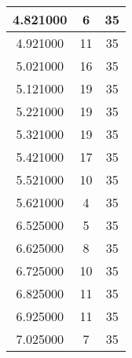 \begin{longtable}[htbp]{|c|c|c|}
4.821000 & 6 & 35 \\ \hline
4.921000 & 11 & 35 \\ \hline
5.021000 & 16 & 35 \\ \hline
5.121000 & 19 & 35 \\ \hline
5.221000 & 19 & 35 \\ \hline
5.321000 & 19 & 35 \\ \hline
5.421000 & 17 & 35 \\ \hline
5.521000 & 10 & 35 \\ \hline
5.621000 & 4 & 35 \\ \hline
6.525000 & 5 & 35 \\ \hline
6.625000 & 8 & 35 \\ \hline
6.725000 & 10 & 35 \\ \hline
6.825000 & 11 & 35 \\ \hline
6.925000 & 11 & 35 \\ \hline
7.025000 & 7 & 35 \\ \hline
\end{longtable}
